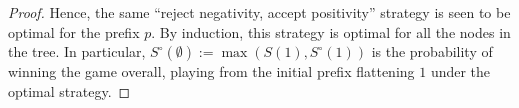 \documentclass[10pt,a4paper]{amsart}
\begin{document}
\begin{proof}
Hence, the same ``reject negativity, accept positivity'' strategy is seen to be
optimal for the prefix $p$.  By induction, this strategy is optimal for all the
nodes in the tree.  In particular, $S^\circ(\emptyset) := \max(S(1),
S^\circ(1))$ is the probability of winning the game overall, playing from the
initial prefix flattening $1$ under the optimal strategy.
\end{proof}
\end{document}
